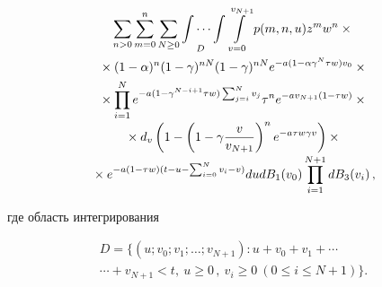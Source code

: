 \begin{multicols}{2}
\noindent
  \begin{multline*}
  \sum\limits_{n>0} \sum\limits^n_{m=0} 
  \sum\limits_{N\geq0} \idotsint\limits_D 
\int\limits_{v=0}^{v_{N+1}} p(m,n,u) z^m w^n \times{}\\
{}\times (1-\alpha)^n (1-\gamma)^{nN} (1-\gamma)^{nN} e^{-a(1-\alpha\gamma^N \tau w)v_0} \times{}\\
  {}\times
\prod\limits^N_{i=1} e^{-a(1-\gamma^{N-i+1}\tau w)\sum\nolimits^N_{j=i} v_j} 
\tau^n e^{-av_{N+1} (1-\tau w)}\times{}\\[-2pt]
  {}\times  
d_v\left(1-\left( 1-\gamma\displaystyle\frac{\displaystyle v\mathstrut}{\displaystyle v_{N+1}\mathstrut}\right)^n e^{-a\tau w\gamma v}\right)\times{}\\[-2pt]
{}\times
e^{-a(1-\tau w) (t-u-\sum\nolimits^N_{i=0} v_i-v)}
du dB_1(v_0) \prod\limits_{i=1}^{N+1} dB_3(v_i)\,,
\end{multline*}

\vspace*{-6pt}

\noindent
где область интегрирования 

\vspace*{-3pt}

\noindent
\begin{multline*}
D= \{(u;v_0;v_1;\ldots ; v_{N+1}): u+ 
v_0+v_1+\cdots\\
\cdots +v_{N+1}< t,\ u\geq 0\,,\ v_i\geq 0\ (0\leq 
i\leq N+1)\}.
\end{multline*}


\end{multicols}
